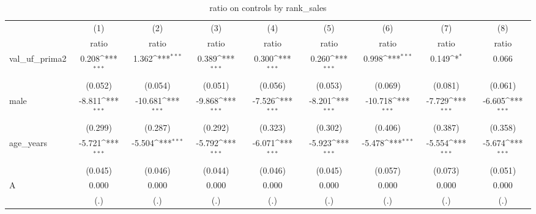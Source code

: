 \begin{table}[htbp]\centering
\def\sym#1{\ifmmode^{#1}\else\(^{#1}\)\fi}
\caption{ratio on controls by rank\_sales}
\begin{tabular}{l*{8}{c}}
\hline\hline
                    &\multicolumn{1}{c}{(1)}&\multicolumn{1}{c}{(2)}&\multicolumn{1}{c}{(3)}&\multicolumn{1}{c}{(4)}&\multicolumn{1}{c}{(5)}&\multicolumn{1}{c}{(6)}&\multicolumn{1}{c}{(7)}&\multicolumn{1}{c}{(8)}\\
                    &\multicolumn{1}{c}{ratio}&\multicolumn{1}{c}{ratio}&\multicolumn{1}{c}{ratio}&\multicolumn{1}{c}{ratio}&\multicolumn{1}{c}{ratio}&\multicolumn{1}{c}{ratio}&\multicolumn{1}{c}{ratio}&\multicolumn{1}{c}{ratio}\\
\hline
val\_uf\_prima2       &       0.208\sym{***}&       1.362\sym{***}&       0.389\sym{***}&       0.300\sym{***}&       0.260\sym{***}&       0.998\sym{***}&       0.149\sym{*}  &       0.066         \\
                    &     (0.052)         &     (0.054)         &     (0.051)         &     (0.056)         &     (0.053)         &     (0.069)         &     (0.081)         &     (0.061)         \\
[1em]
male                &      -8.811\sym{***}&     -10.681\sym{***}&      -9.868\sym{***}&      -7.526\sym{***}&      -8.201\sym{***}&     -10.718\sym{***}&      -7.729\sym{***}&      -6.605\sym{***}\\
                    &     (0.299)         &     (0.287)         &     (0.292)         &     (0.323)         &     (0.302)         &     (0.406)         &     (0.387)         &     (0.358)         \\
[1em]
age\_years           &      -5.721\sym{***}&      -5.504\sym{***}&      -5.792\sym{***}&      -6.071\sym{***}&      -5.923\sym{***}&      -5.478\sym{***}&      -5.554\sym{***}&      -5.674\sym{***}\\
                    &     (0.045)         &     (0.046)         &     (0.044)         &     (0.046)         &     (0.045)         &     (0.057)         &     (0.073)         &     (0.051)         \\
[1em]
A                   &       0.000         &       0.000         &       0.000         &       0.000         &       0.000         &       0.000         &       0.000         &       0.000         \\
                    &         (.)         &         (.)         &         (.)         &         (.)         &         (.)         &         (.)         &         (.)         &         (.)         \\

\end{tabular}
\end{table}
